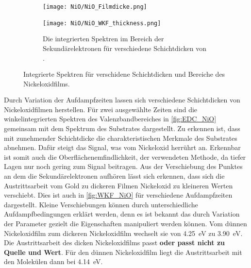         \begin{figure}
            \centering
            \begin{subfigure}[t]{0.48\textwidth}
                \centering
                \texttt{[image: NiO/NiO\_Filmdicke.png]}
                \label{fig:EDC_NiO}
            \end{subfigure}
            \begin{subfigure}[t]{0.48\textwidth}
                \centering
                \texttt{[image: NiO/NiO\_WKF\_thickness.png]}
                \caption{Die integrierten Spektren im Bereich der Sekundärelektronen für verschiedene Schichtdicken von .}
                \label{fig:WKF_NiO}
            \end{subfigure}
            \caption{Integrierte Spektren für verschidene Schichtdicken und Bereiche des Nickeloxidfilms.}
        \end{figure}
        Durch Variation der Aufdampfzeiten lassen sich verschiedene Schichtdicken von Nickeloxidfilmen herstellen.
        Für zwei ausgewählte Zeiten sind die winkelintegrierten Spektren des Valenzbandbereiches in \autoref{fig:EDC_NiO} gemeinsam mit dem Spektrum des Substrates dargestellt.
        Zu erkennen ist, dass mit zunehmender Schichtdicke die charakteristischen Merkmale des Substrates abnehmen.
        Dafür steigt das Signal, was vom Nickeloxid herrührt an.
        Erkennbar ist somit auch die Oberflächenemfindlichkeit, der verwendeten Methode, da tiefer Lagen nur noch gering zum Signal beitragen.
        Aus der Verschiebung des Punktes an dem die Sekundärelektronen aufhören lässt sich erkennen, dass sich die Austrittsarbeit vom Gold zu dickeren Filmen Nickeloxid zu kleineren Werten verschiebt.
        Dies ist auch in \autoref{fig:WKF_NiO} für verschiedene Aufdampfzeiten dargestellt. 
        Kleine Verschiebungen können durch unterschiedliche Aufdampfbedingungen erklärt werden, denn es ist bekannt das durch Variation der Parameter gezielt die Eigenschaften manipuliert werden können.
        Vom dünnen Nickeloxidfilm zum dickeren Nickeloxidfilm wechselt sie von \SI{4.25}{\electronvolt} zu \SI{3.90}{\electronvolt}.
        Die Austrittsarbeit des dicken Nickeloxidfilms passt \textbf{oder passt nicht zu Quelle und Wert}.
        Für den dünnen Nickeloxidfilm liegt die Austrittsarbeit mit den Molekülen dann bei \SI{4.14}{\electronvolt}.

